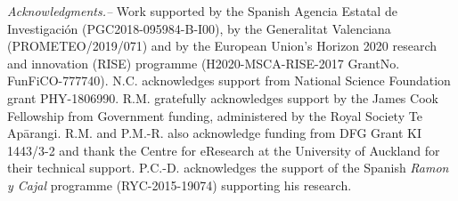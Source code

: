 \documentclass[aps, twocolumn, superscriptaddress, showpacs, nofootinbib, longbibliography]{revtex4-1}
\begin{document}
\begin{abstract}
  
\end{abstract}

\maketitle

\bigskip

\bigskip

\bigskip

\bigskip

\bigskip

\bigskip\noindent\textit{Acknowledgments.--} Work supported by the Spanish Agencia Estatal de Investigaci\'on (PGC2018-095984-B-I00), by the Generalitat Valenciana (PROMETEO/2019/071) and by the European Union’s Horizon 2020 research and innovation (RISE) programme (H2020-MSCA-RISE-2017 GrantNo. FunFiCO-777740).
N.C. acknowledges support from National Science Foundation grant PHY-1806990.
R.M. gratefully acknowledges support by the James Cook Fellowship from Government funding, administered by the Royal Society Te  Ap\={a}rangi. R.M. and P.M.-R. also acknowledge funding from  DFG Grant KI 1443/3-2 and thank the Centre for eResearch at the University of Auckland for their technical support.
P.C.-D. acknowledges the support of the Spanish {\it Ramon y Cajal} programme (RYC-2015-19074) supporting his research.
\begin{appendices}

\end{appendices}
%

\end{document}
